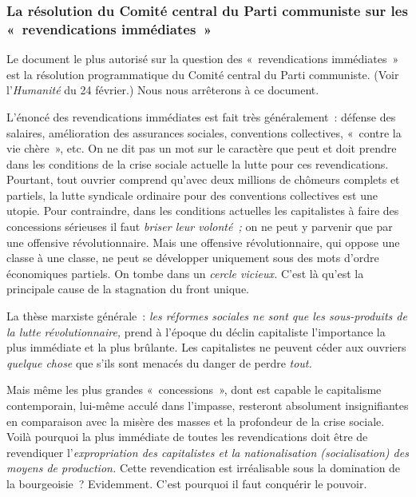 \documentclass[french,twoside]{book} %
\begin{document}
\subsubsection[{La résolution du Comité central du Parti communiste sur les « revendications immédiates »}]{La résolution du Comité central du Parti communiste sur les « revendications immédiates »}
\noindent Le document le plus autorisé sur la question des « revendications immédiates » est la résolution programmatique du Comité central du Parti communiste. (Voir l’\emph{Humanité} du 24 février.) Nous nous arrêterons à ce document.\par
L’énoncé des revendications immédiates est fait très généralement : défense des salaires, amélioration des assurances sociales, conventions collectives, « contre la vie chère », etc. On ne dit pas un mot sur le caractère que peut et doit prendre dans les conditions de la crise sociale actuelle la lutte pour ces revendications. Pourtant, tout ouvrier comprend qu’avec deux millions de chômeurs complets et partiels, la lutte syndicale ordinaire pour des conventions collectives est une utopie. Pour contraindre, dans les conditions actuelles les capitalistes à faire des concessions  sérieuses il faut \emph{briser leur volonté ;} on ne peut y parvenir que par une offensive révolutionnaire. Mais une offensive révolutionnaire, qui oppose une classe à une classe, ne peut se développer uniquement sous des mots d’ordre économiques partiels. On tombe dans un \emph{cercle vicieux.} C’est là qu’est la principale cause de la stagnation du front unique.\par
La thèse marxiste générale : \emph{les réformes sociales ne sont que les sous-produits de la lutte révolutionnaire,} prend à l’époque du déclin capitaliste l’importance la plus immédiate et la plus brûlante. Les capitalistes ne peuvent céder aux ouvriers \emph{quelque chose} que s’ils sont menacés du danger de perdre \emph{tout.}\par
Mais même les plus grandes « concessions », dont est capable le capitalisme contemporain, lui-même acculé dans l’impasse, resteront absolument insignifiantes en comparaison avec la misère des masses et la profondeur de la crise sociale. Voilà pourquoi la plus immédiate de toutes les revendications doit être de revendiquer l’\emph{expropriation des capitalistes et la nationalisation (socialisation) des moyens de production.} Cette revendication est irréalisable sous la domination de la bourgeoisie ? Evidemment. C’est pourquoi il faut conquérir le pouvoir.
\end{document}
